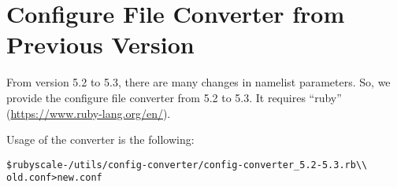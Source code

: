 \section{Configure File Converter from Previous Version}

From version 5.2 to 5.3, there are many changes in namelist parameters.
So, we provide the configure file converter from 5.2 to 5.3.
It requires ``ruby'' (\url{https://www.ruby-lang.org/en/}).

Usage of the converter is the following:\\
\begin{alltt}
 \$ ruby scale-{\version}/utils/config-converter/config-converter_5.2-5.3.rb \verb|\\|
        old.conf > new.conf
\end{alltt}
